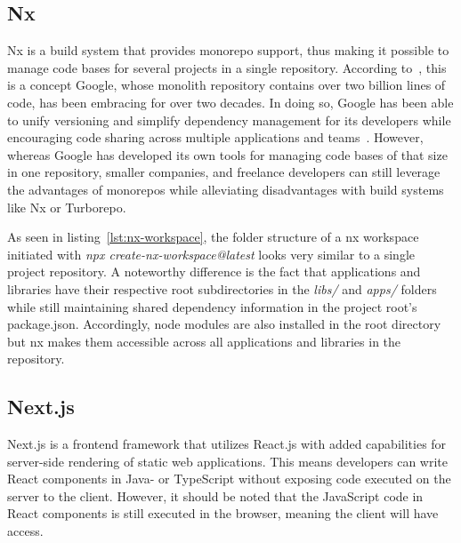 \subsection{Nx}\label{subsec:nx}

Nx is a build system that provides monorepo support, thus making it possible to manage code bases for several projects in a single repository.
According to~\textcite[80]{potvin_why_2016}, this is a concept Google, whose monolith repository contains over two billion lines of code, has been embracing for over two decades.
In doing so, Google has been able to unify versioning and simplify dependency management for its developers while encouraging code sharing across multiple applications and teams~\autocite[84]{potvin_why_2016}.
However, whereas Google has developed its own tools for managing code bases of that size in one repository, smaller companies, and freelance developers can still leverage the advantages of monorepos while alleviating disadvantages with build systems like Nx or Turborepo.

As seen in listing~\ref{lst:nx-workspace}, the folder structure of a nx workspace initiated with \emph{npx create-nx-workspace@latest} looks very similar to a single project repository.
A noteworthy difference is the fact that applications and libraries have their respective root subdirectories in the \emph{libs/} and \emph{apps/} folders while still maintaining shared dependency information in the project root's package.json.
Accordingly, node modules are also installed in the root directory but nx makes them accessible across all applications and libraries in the repository.


\subsection{Next.js}\label{subsec:next.js}

Next.js is a frontend framework that utilizes React.js with added capabilities for server-side rendering of static web applications.
This means developers can write React components in Java- or TypeScript without exposing code executed on the server to the client.
However, it should be noted that the JavaScript code in React components is still executed in the browser, meaning the client will have access.


